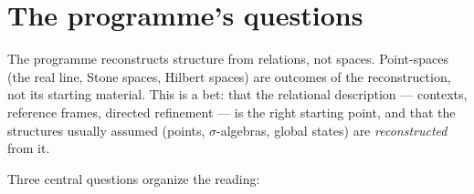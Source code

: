 \maketitle

\tableofcontents



\section*{The programme's questions}

The programme reconstructs structure from relations, not spaces.
Point-spaces (the real line, Stone spaces, Hilbert spaces) are
outcomes of the reconstruction, not its starting material.  This
is a bet: that the relational description --- contexts, reference
frames, directed refinement --- is the right starting point, and
that the structures usually assumed (points, $\sigma$-algebras,
global states) are \emph{reconstructed} from it.

\medskip\noindent
Three central questions organize the reading:

